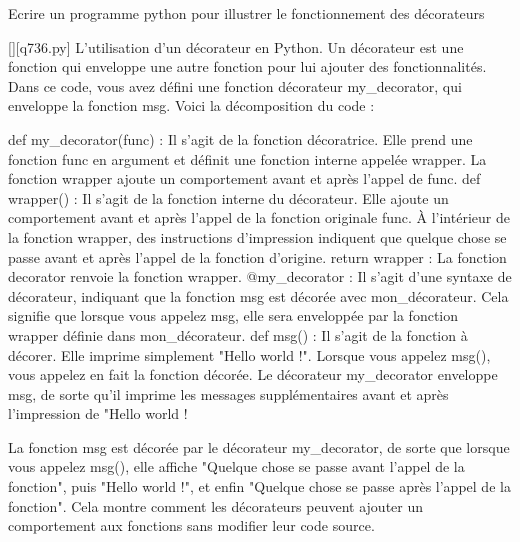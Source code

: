         \question
        Ecrire un programme python pour illustrer le fonctionnement des décorateurs
        \par
        \begin{solution}
            \renewcommand{\nomfichier}{q736.py}
            \pythonfile{\chemincode \nomfichier}[][\nomfichier]
            L'utilisation d'un décorateur en Python. Un décorateur est une fonction qui enveloppe une autre fonction pour lui ajouter des fonctionnalités. Dans ce code, vous avez défini une fonction décorateur my_decorator, qui enveloppe la fonction msg. Voici la décomposition du code :

    def my_decorator(func) : Il s'agit de la fonction décoratrice. Elle prend une fonction func en argument et définit une fonction interne appelée wrapper. La fonction wrapper ajoute un comportement avant et après l'appel de func.
    def wrapper() : Il s'agit de la fonction interne du décorateur. Elle ajoute un comportement avant et après l'appel de la fonction originale func.
    À l'intérieur de la fonction wrapper, des instructions d'impression indiquent que quelque chose se passe avant et après l'appel de la fonction d'origine.
    return wrapper : La fonction decorator renvoie la fonction wrapper.
    @my_decorator : Il s'agit d'une syntaxe de décorateur, indiquant que la fonction msg est décorée avec mon_décorateur. Cela signifie que lorsque vous appelez msg, elle sera enveloppée par la fonction wrapper définie dans mon_décorateur.
    def msg() : Il s'agit de la fonction à décorer. Elle imprime simplement "Hello world !".
    Lorsque vous appelez msg(), vous appelez en fait la fonction décorée. Le décorateur my_decorator enveloppe msg, de sorte qu'il imprime les messages supplémentaires avant et après l'impression de "Hello world !

La fonction msg est décorée par le décorateur my_decorator, de sorte que lorsque vous appelez msg(), elle affiche "Quelque chose se passe avant l'appel de la fonction", puis "Hello world !", et enfin "Quelque chose se passe après l'appel de la fonction". Cela montre comment les décorateurs peuvent ajouter un comportement aux fonctions sans modifier leur code source.
        \end{solution}
        

